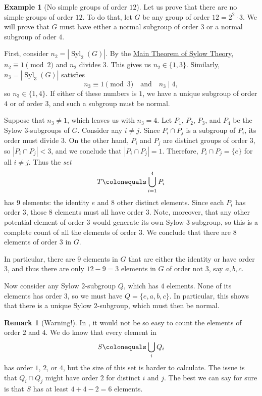 \documentclass[12pt]{report}
\numberwithin{equation}{section}
\numberwithin{theorem}{chapter}
\theoremstyle{definition}
\newtheorem{example}[theorem]{Example}
\newtheorem*{basic properties}{Basic Properties}
\newtheorem*{Important Remark}{Important Remark}
\newtheorem{remark}[theorem]{Remark}
\DeclareMathOperator{\Syl}{Syl}
\begin{document}
\begin{example}[No simple groups of order $12$]\label{example sylow 12}
Let us prove that there are no simple groups of order $12$. To do that, let $G$ be any group of order $12 = 2^2 \cdot 3$. We will prove that $G$ must have either a normal subgroup of order $3$ or a normal subgroup of oder $4$.


First, consider $n_2=|\Syl_2(G)|$. By the \hyperref[Sylow]{Main Theorem of Sylow Theory}, $n_2 \equiv 1 \!\pmod 2$ and $n_2$ divides $3$. This gives us $n_2 \in \{ 1, 3 \}$. Similarly, $n_3 = |\Syl_3(G)|$ satisfies
$$n_3 \equiv 1 \!\!\pmod 3 \quad \textrm{and} \quad n_3 \mid 4,$$
so $n_3 \in \{1, 4 \}$.
If either of these numbers is $1$, we have a unique subgroup of order $4$ or of order $3$, and such a subgroup must be normal. 

Suppose that $n_3 \neq 1$, which leaves us with $n_3 = 4$. Let $P_1$, $P_2$, $P_3$, and $P_4$ be the Sylow $3$-subgroups of $G$. Consider any $i \neq j$. Since $P_i \cap P_j$ is a subgroup of $P_i$, its order must divide $3$. On the other hand, $P_i$ and $P_j$ are distinct groups of order $3$, so $|P_i \cap P_j| < 3$, and we conclude that  $|P_i \cap P_j| = 1$. Therefore, $P_i \cap P_j = \{e\}$ for all $i \neq j$. Thus the {\em set} 
$$T \colonequals \bigcup_{i=1}^4 P_i$$ 
has $9$ elements: the identity $e$ and $8$ other distinct elements. Since each $P_i$ has order $3$, those $8$ elements must all have order $3$. Note, moreover, that any other potential element of order $3$ would generate its own Sylow $3$-subgroup, so this is a complete count of all the elements of order $3$. We conclude that there are $8$ elements of order $3$ in $G$.

In particular, there are $9$ elements in $G$ that are either the identity or have order $3$, and thus there are only $12-9=3$ elements in $G$ of order not $3$, say $a, b, c$.

Now consider any Sylow $2$-subgroup $Q$, which has $4$ elements. None of its elements has order $3$, so we must have $Q = \{ e, a, b, c \}$. In particular, this shows that there is a unique Sylow $2$-subgroup, which must then be normal.
\end{example}


\begin{remark}[Warning!]
In , it would not be so easy to count the elements of order $2$ and $4$. We do know that every element in 
$$S \colonequals \bigcup_i Q_i$$ 
has order $1$, $2$, or $4$, but the size of this set is harder to calculate. The issue is that $Q_i \cap Q_j$ might have order $2$ for distinct $i$ and $j$. The best we can say for sure is that $S$ has at least $4 + 4 - 2 = 6$ elements.
\end{remark}
\end{document}
